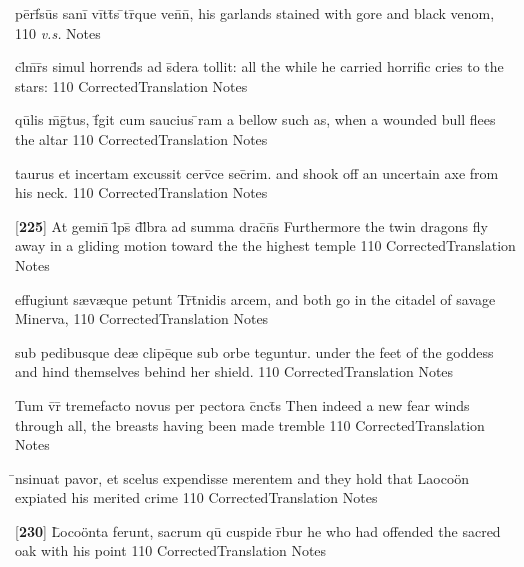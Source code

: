 \latline
  {p\=erf\={}s\=us s\-an\-i\={} v\=itt\={}s \={}tr\={}qu\-e v\-en\={}n\={},}
  { his garlands stained with gore and black venom, }
  {110}
  { \emph{v.s.} }
  { Notes }


\latline
  {cl\={}m\={}r\={}s simul horrend\={}s ad s\={\macron {\i}}dera tollit:}
  { all the while he carried horrific cries to the stars: }
  {110}
  { CorrectedTranslation }
  { Notes }


\latline
  {qu\={}lis m\={}g\={\macron {\i}}tus, f\={}git cum saucius \={}ram}
  { a bellow such as, when a wounded bull flees the altar }
  {110}
  { CorrectedTranslation }
  { Notes }


\latline
  {taurus et incertam excussit cerv\={\macron {\i}}ce sec\={}rim.}
  { and shook off an uncertain axe from his neck.  }
  {110}
  { CorrectedTranslation }
  { Notes }


\latline
  {[\textbf{225}] At gemin\={\macron {\i}} l\={}ps\={} d\={}l\={}bra ad summa drac\={}n\={}s}
  { Furthermore the twin dragons fly away in a gliding motion toward the the highest temple }
  {110}
  { CorrectedTranslation }
  { Notes }


\latline
  {effugiunt s{\ae}v{\ae}que petunt Tr\={\macron {\i}}t\={}nidis arcem,}
  { and both go in the citadel of savage Minerva, }
  {110}
  { CorrectedTranslation }
  { Notes }


\latline
  {sub pedibusque de{\ae} clipe\={\macron {\i}}que sub orbe teguntur.}
  { under the feet of the goddess and hind themselves behind her shield. }
  {110}
  { CorrectedTranslation }
  { Notes }


\latline
  {Tum v\={}r\={} tremefacto novus per pectora c\={}nct\={\macron {\i}}s}
  { Then indeed a new fear winds through all, the breasts having been made tremble }
  {110}
  { CorrectedTranslation }
  { Notes }


\latline
  {\={\macron {\i}}nsinuat pavor, et scelus expendisse merentem}
  { and they hold that Laoco\"on expiated his merited crime  }
  {110}
  { CorrectedTranslation }
  { Notes }


\latline
  {[\textbf{230}] L\={}oco\"{o}nta ferunt, sacrum qu\={\macron {\i}} cuspide r\={}bur }
  { he who had offended the sacred oak with his point }
  {110}
  { CorrectedTranslation }
  { Notes }


